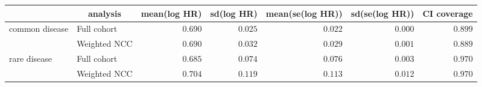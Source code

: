 %
\begin{table}[!tbp]
\begin{center}
\begin{tabular}{llrrrrr}
\toprule
\multicolumn{1}{l}{}&\multicolumn{1}{c}{analysis}&\multicolumn{1}{c}{mean(log HR)}&\multicolumn{1}{c}{sd(log HR)}&\multicolumn{1}{c}{mean(se(log HR))}&\multicolumn{1}{c}{sd(se(log HR))}&\multicolumn{1}{c}{CI coverage}\tabularnewline
\midrule
common disease&Full cohort&$0.690$&$0.025$&$0.022$&$0.000$&$0.899$\tabularnewline
&Weighted NCC&$0.690$&$0.032$&$0.029$&$0.001$&$0.889$\tabularnewline
rare disease&Full cohort&$0.685$&$0.074$&$0.076$&$0.003$&$0.970$\tabularnewline
 &Weighted NCC&$0.704$&$0.119$&$0.113$&$0.012$&$0.970$\tabularnewline
\bottomrule
\end{tabular}
\end{center}
\end{table}

